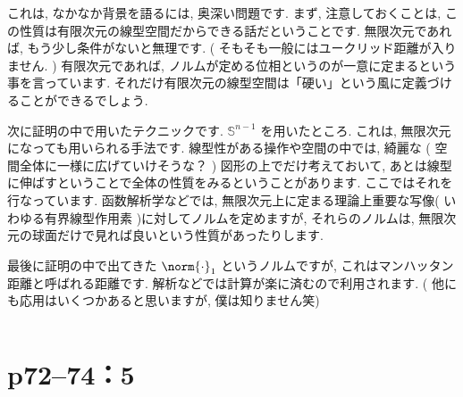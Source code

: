 \begin{column}
    これは, なかなか背景を語るには, 奥深い問題です. まず, 注意しておくことは, この性質は有限次元の線型空間だからできる話だということです. 無限次元であれば, もう少し条件がないと無理です. ( そもそも一般にはユークリッド距離が入りません. ) 有限次元であれば, ノルムが定める位相というのが一意に定まるという事を言っています. それだけ有限次元の線型空間は「硬い」という風に定義づけることができるでしょう.

    次に証明の中で用いたテクニックです.  $\mathbb{S}^{n-1}$ を用いたところ. これは, 無限次元になっても用いられる手法です. 線型性がある操作や空間の中では, 綺麗な ( 空間全体に一様に広げていけそうな？ ) 図形の上でだけ考えておいて, あとは線型に伸ばすということで全体の性質をみるということがあります. ここではそれを行なっています. 函数解析学などでは, 無限次元上に定まる理論上重要な写像( いわゆる有界線型作用素 )に対してノルムを定めますが, それらのノルムは, 無限次元の球面だけで見れば良いという性質があったりします.

    最後に証明の中で出てきた $\norm{ \cdot } _ 1$ というノルムですが, これはマンハッタン距離と呼ばれる距離です. 解析などでは計算が楽に済むので利用されます. ( 他にも応用はいくつかあると思いますが, 僕は知りません笑)
\end{column}
\newpage

\section*{p72--74：5}

